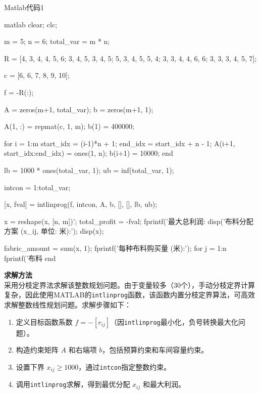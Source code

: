 \begin{codebox}{Matlab代码}{1}
    \begin{amzcode}{matlab}
        clear; clc;
        
        m = 5; %
        n = 6; %
        total_var = m * n; %
        
        R = [4, 3, 4, 4, 5, 6;
             3, 4, 5, 3, 4, 5;
             5, 3, 4, 5, 5, 4;
             3, 3, 4, 4, 6, 6;
             3, 3, 3, 4, 5, 7];
        
        c = [6, 6, 7, 8, 9, 10];
        
        f = -R(:); %
        
        A = zeros(m+1, total_var); %
        b = zeros(m+1, 1);
        
        A(1, :) = repmat(c, 1, m); %
        b(1) = 400000;
        
        for i = 1:m
        start_idx = (i-1)*n + 1;
            end_idx = start_idx + n - 1;
            A(i+1, start_idx:end_idx) = ones(1, n);
            b(i+1) = 10000;
        end
        
        lb = 1000 * ones(total_var, 1); %
        ub = inf(total_var, 1);
        
        intcon = 1:total_var; %
        
        [x, fval] = intlinprog(f, intcon, A, b, [], [], lb, ub);
        
        x = reshape(x, [n, m])'; %
        total_profit = -fval; %
        fprintf('最大总利润: %
        disp('布料分配方案 (x_ij, 单位: 米):');
        disp(x);
        
        fabric_amount = sum(x, 1);
        fprintf('每种布料购买量 (米):\n');
        for j = 1:n
            fprintf('布料 %
        end
    \end{amzcode}
\end{codebox}

\textbf{求解方法}\\
采用分枝定界法求解该整数规划问题。由于变量较多（30个），手动分枝定界计算复杂，因此使用MATLAB的\texttt{intlinprog}函数，该函数内置分枝定界算法，可高效求解整数线性规划问题。求解步骤如下：
\begin{enumerate}
    \item 定义目标函数系数 \( f = -[r_{ij}] \)（因\texttt{intlinprog}最小化，负号转换最大化问题）。
    \item 构造约束矩阵 \( A \) 和右端项 \( b \)，包括预算约束和车间容量约束。
    \item 设置下界 \( x_{ij} \geq 1000 \)，通过\texttt{intcon}指定整数约束。
    \item 调用\texttt{intlinprog}求解，得到最优分配 \( x_{ij} \) 和最大利润。
\end{enumerate}

